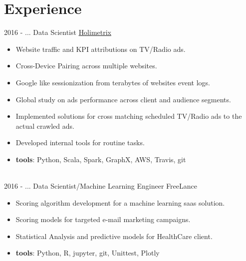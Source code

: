 \documentclass[letterpaper]{twentysecondcv} %
\begin{document}
\makeprofile %



\section{Experience}{\faAlignJustify}

\begin{twenty} %
\twentyitem
    	{2016 - ...}
		{}
        {Data Scientist}
        {\href{http://www.holimetrix.ccom/}{Holimetrix}}
        {}
        {\vspace{-2mm}\begin{itemize}[topsep=0pt,partopsep=0pt]
				\item  Website traffic and KPI attributions on TV/Radio ads.
				\item Cross-Device Pairing across multiple websites.
				\item Google like sessionization from terabytes of websites event logs.
				\item Global study on ads performance across client and audience segments.
				\item Implemented solutions for cross matching scheduled TV/Radio ads to the actual crawled ads.
				\item Developed internal tools for routine tasks.
				\item \textbf{tools}: Python, Scala, Spark, GraphX, AWS, Travis, git
				\end{itemize}} \\
				
	\twentyitem
    	{2016 - ...}
		{}
        {Data Scientist/Machine Learning Engineer}
        {FreeLance}
        {}
        {\vspace{-2mm}\begin{itemize}[topsep=0pt,partopsep=0pt]
        \item Scoring algorithm development for a machine learning saas solution.
        \item Scoring models for targeted e-mail marketing campaigns. 
        \item Statistical Analysis and predictive models for HealthCare client. 
				\item \textbf{tools}: Python, R, jupyter, git, Unittest, Plotly
    \end{itemize}} \\
		

\end{twenty}
\end{document}
